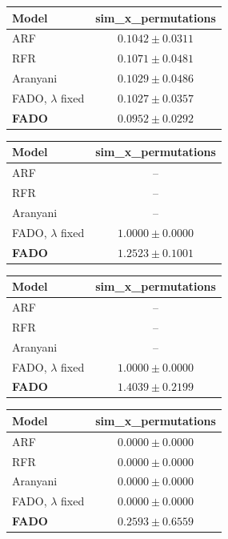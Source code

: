 \begin{tabular}{lc}
\toprule
\textbf{Model} & sim\_x\_permutations \\
\midrule
ARF & $0.1042 \pm 0.0311$ \\
RFR & $0.1071 \pm 0.0481$ \\
Aranyani & $0.1029 \pm 0.0486$ \\
FADO, $\lambda$ fixed & $0.1027 \pm 0.0357$ \\
\textbf{FADO} & $0.0952 \pm 0.0292$ \\
\bottomrule
\end{tabular}

\begin{tabular}{lc}
\toprule
\textbf{Model} & sim\_x\_permutations \\
\midrule
ARF & -- \\
RFR & -- \\
Aranyani & -- \\
FADO, $\lambda$ fixed & $1.0000 \pm 0.0000$ \\
\textbf{FADO} & $1.2523 \pm 0.1001$ \\
\bottomrule
\end{tabular}

\begin{tabular}{lc}
\toprule
\textbf{Model} & sim\_x\_permutations \\
\midrule
ARF & -- \\
RFR & -- \\
Aranyani & -- \\
FADO, $\lambda$ fixed & $1.0000 \pm 0.0000$ \\
\textbf{FADO} & $1.4039 \pm 0.2199$ \\
\bottomrule
\end{tabular}

\begin{tabular}{lc}
\toprule
\textbf{Model} & sim\_x\_permutations \\
\midrule
ARF & $0.0000 \pm 0.0000$ \\
RFR & $0.0000 \pm 0.0000$ \\
Aranyani & $0.0000 \pm 0.0000$ \\
FADO, $\lambda$ fixed & $0.0000 \pm 0.0000$ \\
\textbf{FADO} & $0.2593 \pm 0.6559$ \\
\bottomrule
\end{tabular}

